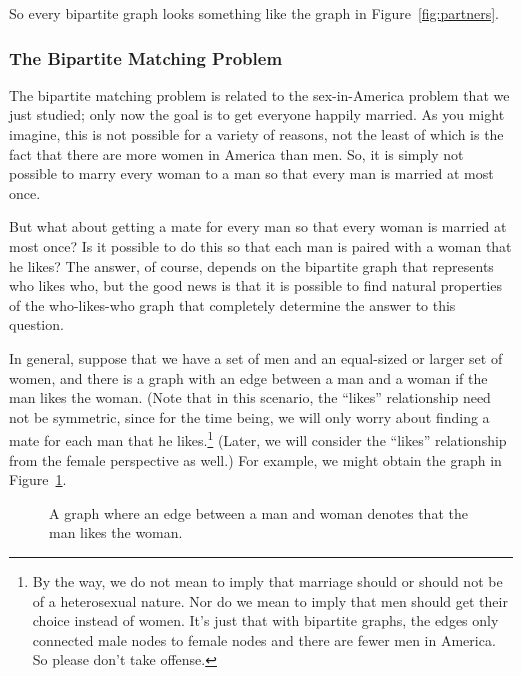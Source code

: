 So every bipartite graph looks something like the graph in
Figure~\ref{fig:partners}.

\subsubsection{The Bipartite Matching Problem}

The bipartite matching problem is related to the sex-in-America
problem that we just studied; only now the goal is to get everyone
happily married.  As you might imagine, this is not possible for a
variety of reasons, not the least of which is the fact that there are
more women in America than men.  So, it is simply not possible to
marry every woman to a man so that every man is married at most once.

But what about getting a mate for every man so that every woman is married
at most once?  Is it possible to do this so that each man is paired with a
woman that he likes?  The answer, of course, depends on the bipartite graph
that represents who likes who, but the good news is that it is possible to
find natural properties of the who-likes-who graph that completely
determine the answer to this question.

In general, suppose that we have a set of men and an equal-sized or
larger set of women, and there is a graph with an edge between a man
and a woman if the man likes the woman.  (Note that in this scenario,
the ``likes'' relationship need not be symmetric, since for the time
being, we will only worry about finding a mate for each man that he
likes.\footnote{By the way, we do not mean to imply that marriage
  should or should not be of a heterosexual nature.  Nor do we mean to
  imply that men should get their choice instead of women.  It's just
  that with bipartite graphs, the edges only connected male nodes to
  female nodes and there are fewer men in America.  So please don't
  take offense.}  (Later, we will consider the ``likes'' relationship
from the female perspective as well.)  For example, we might obtain
the graph in Figure~\ref{fig:5J}.

\begin{figure}



\caption{A graph where an edge between a man and woman denotes that
  the man likes the woman.}

\label{fig:5J}

\end{figure}

